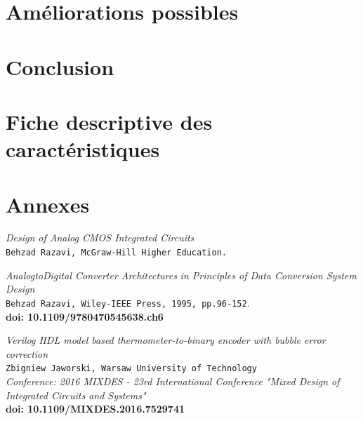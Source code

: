 \documentclass[11pt]{article}
\begin{document}
\section{Am\'eliorations possibles}

\section{Conclusion}

\clearpage

\section{Fiche descriptive des caract\'eristiques}

\clearpage

\section{Annexes}

\clearpage


\begin{thebibliography}{9}
\textit{Design of Analog CMOS Integrated Circuits}
\\\texttt{Behzad Razavi, McGraw-Hill Higher Education.}

\textit{AnalogtoDigital Converter Architectures}
\textit{in Principles of Data Conversion System Design}\\
\texttt{Behzad Razavi, Wiley-IEEE Press, 1995, pp.96-152}.\\
\textbf{doi: 10.1109/9780470545638.ch6}

\textit{Verilog HDL model based thermometer-to-binary encoder with bubble error correction}\\
\texttt{Zbigniew Jaworski, Warsaw University of Technology}\\
\textit{Conference: 2016 MIXDES - 23rd International Conference "Mixed Design of Integrated Circuits and Systems"}\\
\textbf{doi: 10.1109/MIXDES.2016.7529741}

\end{thebibliography}
\end{document}
